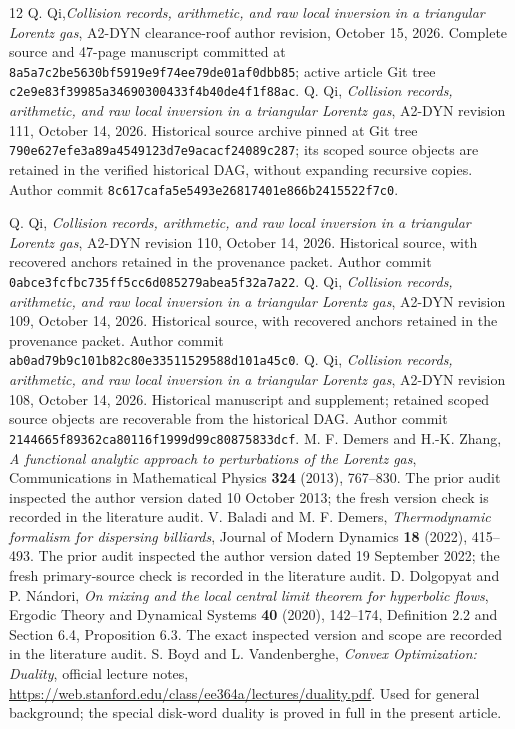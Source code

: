 \documentclass[11pt,reqno]{amsart}
\numberwithin{equation}{section}
\theoremstyle{definition}\newtheorem{definition}[theorem]{Definition}
\theoremstyle{remark}\newtheorem{remark}[theorem]{Remark}
\begin{document}
\begin{thebibliography}{12}
 Q. Qi,\emph{Collision records, arithmetic, and raw local inversion in a
triangular Lorentz gas}, A2-DYN clearance-roof author revision,
October 15, 2026. Complete source and 47-page manuscript
committed at \texttt{8a5a7c2be5630bf5919e9f74ee79de01af0dbb85};
active article Git tree \texttt{c2e9e83f39985a34690300433f4b40de4f1f88ac}.
 Q. Qi,
\emph{Collision records, arithmetic, and raw local inversion in a
triangular Lorentz gas}, A2-DYN revision 111, October 14, 2026.
Historical source archive pinned at Git tree \texttt{790e627efe3a89a4549123d7e9acacf24089c287}; its scoped source objects are retained in the verified historical DAG, without expanding recursive copies.
Author commit \texttt{8c617cafa5e5493e26817401e866b2415522f7c0}.

 Q. Qi,
\emph{Collision records, arithmetic, and raw local inversion in a
triangular Lorentz gas}, A2-DYN revision 110, October 14, 2026.
Historical source, with recovered anchors retained in the provenance packet.
Author commit \texttt{0abce3fcfbc735ff5cc6d085279abea5f32a7a22}.
 Q. Qi,
\emph{Collision records, arithmetic, and raw local inversion in a
triangular Lorentz gas}, A2-DYN revision 109, October 14, 2026.
Historical source, with recovered anchors retained in the provenance packet.
Author commit \texttt{ab0ad79b9c101b82c80e33511529588d101a45c0}.
 Q. Qi,
\emph{Collision records, arithmetic, and raw local inversion in a
triangular Lorentz gas}, A2-DYN revision 108, October 14, 2026.
Historical manuscript and supplement; retained scoped source objects are recoverable from the historical DAG. Author commit
\texttt{2144665f89362ca80116f1999d99c80875833dcf}.
 M. F. Demers and H.-K. Zhang,
\emph{A functional analytic approach to perturbations of the Lorentz gas},
Communications in Mathematical Physics \textbf{324} (2013), 767--830.
The prior audit inspected the author version dated 10 October 2013; the fresh version check is recorded in the literature audit.
 V. Baladi and M. F. Demers,
\emph{Thermodynamic formalism for dispersing billiards},
Journal of Modern Dynamics \textbf{18} (2022), 415--493.
The prior audit inspected the author version dated 19 September 2022; the fresh primary-source check is recorded in the literature audit.
 D. Dolgopyat and P. N\'andori,
\emph{On mixing and the local central limit theorem for hyperbolic flows},
Ergodic Theory and Dynamical Systems \textbf{40} (2020), 142--174,
Definition 2.2 and Section 6.4, Proposition 6.3. The exact inspected
version and scope are recorded in the literature audit.
 S. Boyd and L. Vandenberghe,
\emph{Convex Optimization: Duality}, official lecture notes,
\url{https://web.stanford.edu/class/ee364a/lectures/duality.pdf}.
Used for general background; the special disk-word duality is proved
in full in the present article.
\end{thebibliography}
\end{document}
